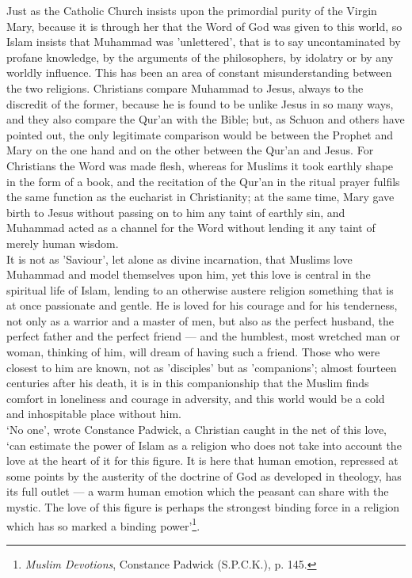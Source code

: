 \documentclass[10pt, twoside]{book}
\begin{document}
Just as the Catholic Church insists upon the primordial purity of the Virgin Mary, because it is 
through her that the Word of God was given to this world, so Islam insists that Muhammad was 
'unlettered', that is to say uncontaminated by profane knowledge, by the arguments of the 
philosophers, by idolatry or by any worldly influence. This has been an area of constant 
misunderstanding between the two religions. Christians compare Muhammad to Jesus, always to the 
discredit of the former, because he is found to be unlike Jesus in so many ways, and they also 
compare the Qur'an with the Bible; but, as Schuon and others have pointed out, the only legitimate 
comparison would be between the Prophet and Mary on the one hand and on the other between the Qur'an and Jesus. For Christians the Word was made flesh, whereas for Muslims it took earthly shape in the form of a book, and the recitation of the Qur'an in the ritual prayer fulfils the same function as 
the eucharist in Christianity; at the same time, Mary gave birth to Jesus without passing on to him 
any taint of earthly sin, and Muhammad acted as a channel for the Word without lending it any taint 
of merely human wisdom. \\

It is not as 'Saviour', let alone as divine incarnation, that Muslims love Muhammad and model 
themselves upon him, yet this love is central in the spiritual life of Islam, lending to an otherwise 
austere religion something that is at once passionate and gentle. He is loved for his courage and for 
his tenderness, not only as a warrior and a master of men, but also as the perfect husband, the 
perfect father and the perfect friend --- and the humblest, most wretched man or woman, thinking of 
him, will dream of having such a friend. Those who were closest to him are known, not as 'disciples' 
but as 'companions'; almost fourteen centuries after his death, it is in this companionship that the 
Muslim finds comfort in loneliness and courage in adversity, and this world would be a cold and 
inhospitable place without him. \\

`No one', wrote Constance Padwick, a Christian caught in the net of this love, `can estimate the 
power of Islam as a religion who does not take into account the love at the heart of it for this 
figure. It is here that human emotion, repressed at some points by the austerity of the doctrine of 
God as developed in theology, has its full outlet --- a warm human emotion which the peasant can share 
with the mystic. The love of this figure is perhaps the strongest binding force in a religion which 
has so marked a binding power'\footnote{\emph{Muslim Devotions}, Constance Padwick (S.P.C.K.), p. 145.}. \\
\end{document}
